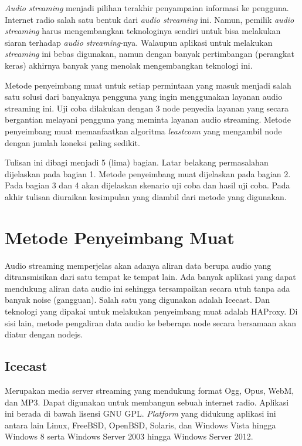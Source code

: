 \documentclass[conference]{IEEEtran}
\begin{document}
	\indent
	\textit{Audio streaming} menjadi pilihan terakhir penyampaian informasi ke pengguna. Internet radio salah satu bentuk dari \textit{audio streaming} ini. Namun, pemilik \textit{audio streaming} harus mengembangkan teknologinya sendiri untuk bisa melakukan siaran terhadap \textit{audio streaming}-nya. Walaupun aplikasi untuk melakukan \textit{streaming} ini bebas digunakan, namun dengan banyak pertimbangan (perangkat keras) akhirnya banyak yang menolak mengembangkan teknologi ini.
	
	\indent
	Metode penyeimbang muat untuk setiap permintaan yang masuk menjadi salah satu solusi dari banyaknya pengguna yang ingin menggunakan layanan audio streaming ini. Uji coba dilakukan dengan 3 node penyedia layanan yang secara bergantian melayani pengguna yang meminta layanan audio streaming. Metode penyeimbang muat memanfaatkan algoritma \textit{leastconn} yang mengambil node dengan jumlah koneksi paling sedikit.
	
	\indent
	Tulisan ini dibagi menjadi 5 (lima) bagian. Latar belakang permasalahan dijelaskan pada bagian 1. Metode penyeimbang muat dijelaskan pada bagian 2. Pada bagian 3 dan 4 akan dijelaskan skenario uji coba dan hasil uji coba. Pada akhir tulisan diuraikan kesimpulan yang diambil dari metode yang digunakan.
	
	
	\section{Metode Penyeimbang Muat}
	Audio streaming memperjelas akan adanya aliran data berupa audio yang ditransmisikan dari satu tempat ke tempat lain. Ada banyak aplikasi yang dapat mendukung aliran data audio ini sehingga tersampaikan secara utuh tanpa ada banyak noise (gangguan). Salah satu yang digunakan adalah Icecast. Dan teknologi yang dipakai untuk melakukan penyeimbang muat adalah HAProxy. Di sisi lain, metode pengaliran data audio ke beberapa node secara bersamaan akan diatur dengan nodejs.
	
	\subsection{Icecast}
	Merupakan media server streaming yang mendukung format Ogg, Opus, WebM, dan MP3. Dapat digunakan untuk membangun sebuah internet radio. Aplikasi ini berada di bawah lisensi GNU GPL. \textit{Platform} yang didukung aplikasi ini antara lain Linux, FreeBSD, OpenBSD, Solaris, dan Windows Vista hingga Windows 8 serta Windows Server 2003 hingga Windows Server 2012.
	
\end{document}
